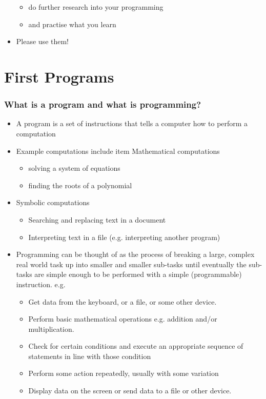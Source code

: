 \documentclass{beamer}
\begin{document}
\begin{frame}
\begin{itemize}
\begin{itemize}
\item do further research into your programming
\item and practise what you learn
\end{itemize}
\item Please use them!
\end{itemize}
\end{frame}

\section{First Programs}
\begin{frame}
\frametitle{What is a program and what is programming?}
\begin{itemize}
\item A program is a set of instructions that tells a computer how to perform a computation
\item Example computations include
item Mathematical computations
\begin{itemize}
\item solving a system of equations
\item finding the roots of a polynomial
\end{itemize}
\item Symbolic computations
\begin{itemize}
\item Searching and replacing text in a document
\item Interpreting text in a file (e.g. interpreting another program)
\end{itemize}
\end{itemize}
\end{frame}

\begin{frame}
\begin{itemize}
\item {
Programming can be thought of as the process of breaking a large, complex real world task up into smaller and smaller
sub-tasks until eventually the sub-tasks are simple enough to be performed with a simple (programmable) instruction. e.g.}
\begin{itemize}
\item
Get data from the keyboard, or a file, or some other device.
\item Perform basic mathematical operations e.g. addition and/or multiplication. 
\item Check for certain conditions and execute an appropriate sequence of statements in line with those condition 
\item Perform some action repeatedly, usually with some variation 
\item Display data on the screen or send data to a file or other device. 
\end{itemize}
\end{itemize}
\end{frame}
\end{document}
